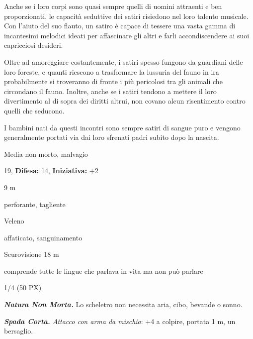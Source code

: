 \begin{multicols}{2}
{Anche se i loro corpi sono quasi sempre quelli di uomini attraenti e ben proporzionati, le capacità seduttive dei satiri risiedono nel loro talento musicale. Con l'aiuto del suo flauto, un satiro è capace di tessere una vasta gamma di incantesimi melodici ideati per affascinare gli altri e farli accondiscendere ai suoi capricciosi desideri.

Oltre ad amoreggiare costantemente, i satiri spesso fungono da guardiani delle loro foreste, e quanti riescono a trasformare la lussuria del fauno in ira probabilmente si troveranno di fronte i più pericolosi tra gli animali che circondano il fauno. Inoltre, anche se i satiri tendono a mettere il loro divertimento al di sopra dei diritti altrui, non covano alcun risentimento contro quelli che seducono.

I bambini nati da questi incontri sono sempre satiri di sangue puro e vengono generalmente portati via dai loro sfrenati padri subito dopo la nascita.

\noindent
\begin{description}[noitemsep, topsep=0pt, parsep=0pt, partopsep=0pt, leftmargin=0cm, labelwidth=2.2cm]
	\item[\textbf{Taglia/Tipo:}] Media non morto, malvagio
	\item[\textbf{Caratt.:}] 
	\item[\textbf{Punti Ferita:}] 19,  \textbf{Difesa:} 14,  \textbf{Iniziativa:} +2
	\item[\textbf{Movimento:}] 9 m
	\item[\textbf{Tiri Salvez.:}] 
	\item[\textbf{Res. Danni:}] perforante, tagliente
	\item[\textbf{Imm. Danni:}] Veleno
	\item[\textbf{Immunità:}] affaticato, sanguinamento
	\item[\textbf{Sensi:}] Scurovisione 18 m
	\item[\textbf{Linguaggi:}] comprende tutte le lingue che parlava in vita ma non può parlare
	\item[\textbf{Sfida:}] 1/4 (50 PX)\smallskip
\end{description}

\emph{\textbf{Natura Non Morta.}} Lo scheletro non necessita aria, cibo, bevande o sonno.

\emph{\textbf{Spada Corta.} Attacco con arma da mischia}: +4 a colpire, portata 1 m, un bersaglio.

}
\end{multicols}
